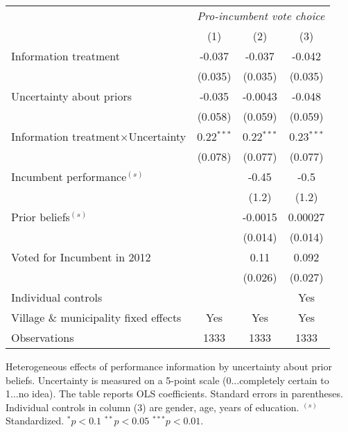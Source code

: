 
    \begin{center}
    \begin{tabular}{l c c c}
    \hline
    &\multicolumn{3}{c}{\emph{Pro-incumbent vote choice}}\\
    &(1)&(2)&(3)\\
    \hline  
    Information treatment&-0.037&-0.037&-0.042\\
    &(0.035)&(0.035)&(0.035)\\
    Uncertainty about priors&-0.035&-0.0043&-0.048\\
    &(0.058)&(0.059)&(0.059)\\
    Information treatment$\times$Uncertainty&0.22$^{***}$&0.22$^{***}$&0.23$^{***}$\\
    &(0.078)&(0.077)&(0.077)\\
    Incumbent performance$^{(s)}$&&-0.45&-0.5\\
    &&(1.2)&(1.2)\\
    Prior beliefs$^{(s)}$&&-0.0015&0.00027\\
    &&(0.014)&(0.014)\\
    Voted for Incumbent in 2012&&0.11&0.092\\
    &&(0.026)&(0.027)\\
    Individual controls&&&Yes\\
    Village \& municipality fixed effects&Yes&Yes&Yes\\
    \hline
    Observations&1333&1333&1333\\
    \hline\hline
    \end{tabular}
    \end{center}
    \caption{Heterogeneous effects of performance information by uncertainty about prior beliefs. Uncertainty is measured on a 5-point scale (0...completely certain to 1...no idea). The table reports OLS coefficients. Standard errors in parentheses. Individual controls in column (3) are gender, age, years of education. $^{(s)}$Standardized. $^{*} p<0.1$ $^{**} p<0.05$ $^{***} p<0.01$. }
    
